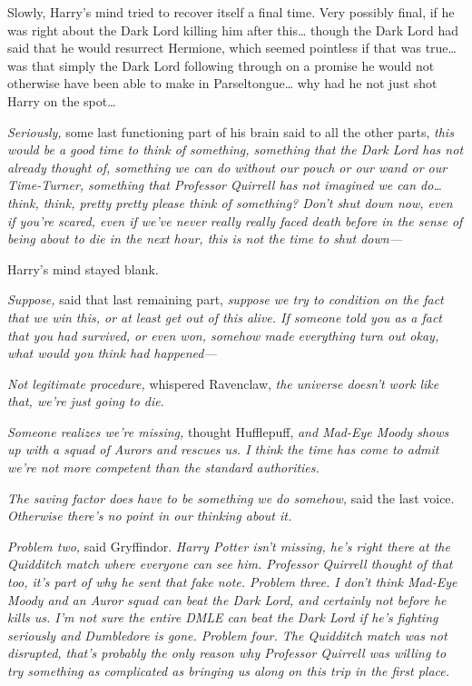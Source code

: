 Slowly, Harry's mind tried to recover itself a final time. Very possibly final, if he was right about the Dark Lord killing him after this{\ldots} though the Dark Lord had said that he would resurrect Hermione, which seemed pointless if that was true{\ldots} was that simply the Dark Lord following through on a promise he would not otherwise have been able to make in Parseltongue{\ldots} why had he not just shot Harry on the spot{\ldots}

\emph{Seriously,} some last functioning part of his brain said to all the other parts, \emph{this would be a good time to think of something, something that the Dark Lord has not already thought of, something we can do without our pouch or our wand or our Time-Turner, something that Professor Quirrell has not imagined we can do{\ldots} think, think, pretty pretty please think of something? Don't shut down now, even if you're scared, even if we've never really really faced death before in the sense of being about to die in the next hour, \emph{this is not the time to shut down—}}

Harry's mind stayed blank.

\emph{Suppose,} said that last remaining part, \emph{suppose we try to condition on the fact that we win this, or at least get out of this alive. If someone \emph{told you as a fact} that you had survived, or even won, somehow made everything turn out okay, what would you think had happened—}

\emph{Not legitimate procedure,} whispered Ravenclaw, \emph{the universe doesn't work like that, we're just going to die}.

\emph{Someone realizes we're missing,} thought Hufflepuff, \emph{and Mad-Eye Moody shows up with a squad of Aurors and rescues us. I think the time has come to admit we're not more competent than the standard authorities.}

\emph{The saving factor does have to be something we \emph{do} somehow,} said the last voice. \emph{Otherwise there's no point in our thinking about it.}

\emph{Problem two,} said Gryffindor. \emph{Harry Potter isn't missing, he's right there at the Quidditch match where everyone can see him. Professor Quirrell thought of that too, it's part of why he sent that fake note. Problem three. I don't think Mad-Eye Moody and an Auror squad can beat the Dark Lord, and certainly not before he kills us. I'm not sure the entire DMLE can beat the Dark Lord if he's fighting seriously and Dumbledore is gone. Problem four. The Quidditch match was not disrupted, that's probably the only reason why Professor Quirrell was willing to try something as complicated as bringing us along on this trip in the first place.}


